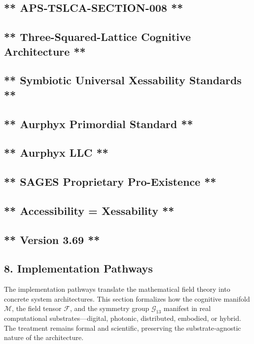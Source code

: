 \subsection{** APS‑TSLCA-SECTION-008 **}\label{apstslca-section-008}

\subsection{** Three-Squared-Lattice Cognitive Architecture **}\label{three-squared-lattice-cognitive-architecture}

\subsection{** Symbiotic Universal Xessability Standards **}\label{symbiotic-universal-xessability-standards}

\subsection{** Aurphyx Primordial Standard **}\label{aurphyx-primordial-standard}

\subsection{** Aurphyx LLC **}\label{aurphyx-llc}

\subsection{** SAGES \textbar{} Proprietary \textbar{} Pro-Existence **}\label{sages-proprietary-pro-existence}

\subsection{** Accessibility = Xessability **}\label{accessibility-xessability}

\subsection{** Version 3.69 **}\label{version-3.69}

\subsection{8. Implementation Pathways}\label{implementation-pathways}

The implementation pathways translate the mathematical field theory into concrete system architectures. This section formalizes how the cognitive manifold \(\mathcal{M}\), the field tensor \(\mathcal{F}\), and the symmetry group \(\mathcal{G}_{13}\) manifest in real computational substrates---digital, photonic, distributed, embodied, or hybrid. The treatment remains formal and scientific, preserving the substrate‑agnostic nature of the architecture.

